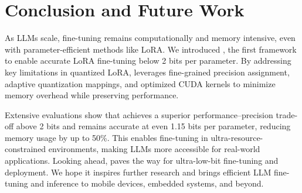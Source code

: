 \section{Conclusion and Future Work}

As LLMs scale, fine-tuning remains computationally and memory intensive, even with parameter-efficient methods like LoRA. 
We introduced \FWName{}, the first framework to enable accurate LoRA fine-tuning below 2 bits per parameter. 
By addressing key limitations in quantized LoRA, \FWName{} leverages fine-grained precision assignment, adaptive quantization mappings, and optimized CUDA kernels to minimize memory overhead while preserving performance.

Extensive evaluations show that \FWName{} achieves a superior performance–precision trade-off above 2 bits and remains accurate at even 1.15 bits per parameter, reducing memory usage by up to 50\%. 
This enables fine-tuning in ultra-resource-constrained environments, making LLMs more accessible for real-world applications.
Looking ahead, \FWName{} paves the way for ultra-low-bit fine-tuning and deployment. 
We hope it inspires further research and brings efficient LLM fine-tuning and inference to mobile devices, embedded systems, and beyond.